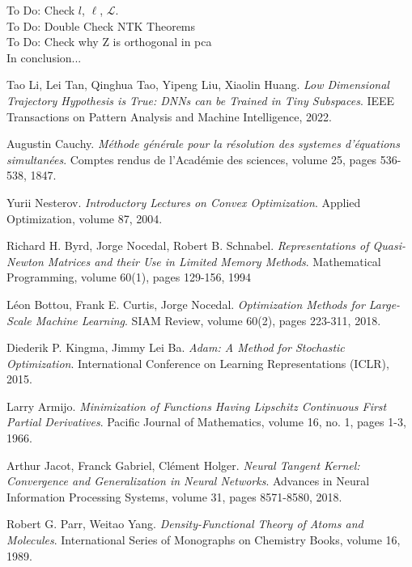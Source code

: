\documentclass[11pt, a4paper]{article}
\renewcommand{\L}{\mathcal{L}}
\begin{document}
To Do: Check $l$, $\ell$, $\L$. \\

To Do: Double Check NTK Theorems \\

To Do: Check why Z is orthogonal in pca \\

In conclusion...

\pagebreak
\begin{thebibliography}{999}

 Tao Li, Lei Tan, Qinghua Tao, Yipeng Liu, Xiaolin Huang. \textit{Low Dimensional Trajectory Hypothesis is True: DNNs can be Trained in Tiny Subspaces}. IEEE Transactions on Pattern Analysis and Machine Intelligence, 2022.

 Augustin Cauchy. \textit{M\'{e}thode g\'{e}n\'{e}rale pour la r\'{e}solution des systemes d'\'{e}quations simultan\'{e}es}. Comptes rendus de l'Acad\'{e}mie des sciences, volume 25, pages 536-538, 1847.

 Yurii Nesterov. \textit{Introductory Lectures on Convex Optimization}. Applied Optimization, volume 87, 2004.

 Richard H. Byrd, Jorge Nocedal, Robert B. Schnabel. \textit{Representations of Quasi-Newton Matrices and their Use in Limited Memory Methods}. Mathematical Programming, volume 60(1), pages 129-156, 1994 

 L\'{e}on Bottou, Frank E. Curtis, Jorge Nocedal. \textit{Optimization Methods for Large-Scale Machine Learning}. SIAM Review, volume 60(2), pages 223-311, 2018.

 Diederik P. Kingma, Jimmy Lei Ba. \textit{Adam: A Method for Stochastic Optimization}. International Conference on Learning Representations (ICLR), 2015.

 Larry Armijo. \textit{Minimization of Functions Having Lipschitz Continuous First Partial Derivatives}. Pacific Journal of Mathematics, volume 16, no. 1, pages 1-3, 1966.

 Arthur Jacot, Franck Gabriel, Cl\'{e}ment Holger. \textit{Neural Tangent Kernel: Convergence and Generalization in Neural Networks}. Advances in Neural Information Processing Systems, volume 31, pages 8571-8580, 2018.

 Robert G. Parr, Weitao Yang. \textit{Density-Functional Theory of Atoms and Molecules}. International Series of Monographs on Chemistry Books, volume 16, 1989.


\end{thebibliography}
\end{document}
